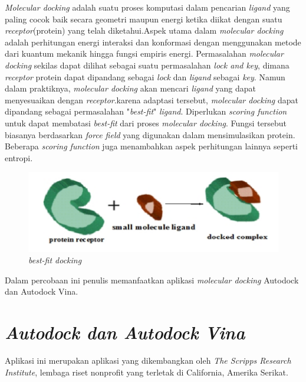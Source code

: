 \textit{Molecular docking} adalah suatu proses komputasi dalam pencarian \textit{ligand} yang paling cocok baik secara geometri maupun energi ketika diikat dengan suatu \textit{receptor}(protein) yang telah diketahui.Aspek utama dalam \textit{molecular docking} adalah perhitungan energi interaksi dan konformasi dengan menggunakan metode dari kuantum mekanik hingga fungsi empiris energi. Permasalahan \textit{molecular docking} sekilas dapat dilihat sebagai suatu permasalahan \textit{lock and key}, dimana \textit{receptor} protein dapat dipandang sebagai \textit{lock} dan \textit{ligand} sebagai \textit{key}. Namun dalam praktiknya, \textit{molecular docking} akan mencari \textit{ligand} yang dapat menyesuaikan dengan \textit{receptor}.karena adaptasi tersebut, \textit{molecular docking} dapat dipandang sebagai permasalahan "\textit{best-fit}" \textit{ligand}. Diperlukan \textit{scoring function} untuk dapat membatasi \textit{best-fit} dari proses \textit{molecular docking}. Fungsi tersebut biasanya berdasarkan \textit{force field} yang digunakan dalam mensimulasikan protein. Beberapa \textit{scoring function} juga menambahkan aspek perhitungan lainnya seperti entropi.
\begin{figure}
	\centering
	\includegraphics{molecular_docking.png}
	\caption{\textit{best-fit docking}}
\end{figure}
Dalam percobaan ini penulis memanfaatkan aplikasi \textit{molecular docking} Autodock dan Autodock Vina.

\section{\textit{Autodock dan Autodock Vina}}
\hspace{0.5cm}Aplikasi ini merupakan aplikasi yang dikembangkan oleh \textit{The Scripps Research Institute}, lembaga riset nonprofit yang terletak di California, Amerika Serikat.